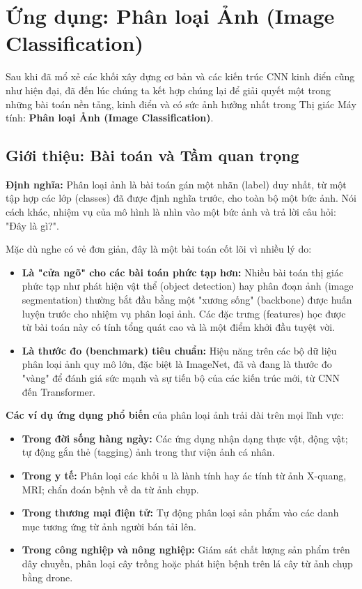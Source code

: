 \section{Ứng dụng: Phân loại Ảnh (Image Classification)}
\label{sec:image_classification_application}

Sau khi đã mổ xẻ các khối xây dựng cơ bản và các kiến trúc CNN kinh điển cũng như hiện đại, đã đến lúc chúng ta kết hợp chúng lại để giải quyết một trong những bài toán nền tảng, kinh điển và có sức ảnh hưởng nhất trong Thị giác Máy tính: \textbf{Phân loại Ảnh (Image Classification)}.

\subsection{Giới thiệu: Bài toán và Tầm quan trọng}
\label{subsec:classification_intro}
\textbf{Định nghĩa:} Phân loại ảnh là bài toán gán một nhãn (label) duy nhất, từ một tập hợp các lớp (classes) đã được định nghĩa trước, cho toàn bộ một bức ảnh. Nói cách khác, nhiệm vụ của mô hình là nhìn vào một bức ảnh và trả lời câu hỏi: "Đây là gì?".

Mặc dù nghe có vẻ đơn giản, đây là một bài toán cốt lõi vì nhiều lý do:
\begin{itemize}
    \item \textbf{Là "cửa ngõ" cho các bài toán phức tạp hơn:} Nhiều bài toán thị giác phức tạp như phát hiện vật thể (object detection) hay phân đoạn ảnh (image segmentation) thường bắt đầu bằng một "xương sống" (backbone) được huấn luyện trước cho nhiệm vụ phân loại ảnh. Các đặc trưng (features) học được từ bài toán này có tính tổng quát cao và là một điểm khởi đầu tuyệt vời.
    \item \textbf{Là thước đo (benchmark) tiêu chuẩn:} Hiệu năng trên các bộ dữ liệu phân loại ảnh quy mô lớn, đặc biệt là ImageNet, đã và đang là thước đo "vàng" để đánh giá sức mạnh và sự tiến bộ của các kiến trúc mới, từ CNN đến Transformer.
\end{itemize}

\textbf{Các ví dụ ứng dụng phổ biến} của phân loại ảnh trải dài trên mọi lĩnh vực:
\begin{itemize}
    \item \textbf{Trong đời sống hàng ngày:} Các ứng dụng nhận dạng thực vật, động vật; tự động gắn thẻ (tagging) ảnh trong thư viện ảnh cá nhân.
    \item \textbf{Trong y tế:} Phân loại các khối u là lành tính hay ác tính từ ảnh X-quang, MRI; chẩn đoán bệnh về da từ ảnh chụp.
    \item \textbf{Trong thương mại điện tử:} Tự động phân loại sản phẩm vào các danh mục tương ứng từ ảnh người bán tải lên.
    \item \textbf{Trong công nghiệp và nông nghiệp:} Giám sát chất lượng sản phẩm trên dây chuyền, phân loại cây trồng hoặc phát hiện bệnh trên lá cây từ ảnh chụp bằng drone.
\end{itemize}


